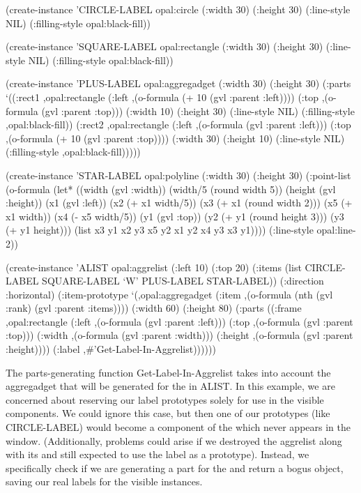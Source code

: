 \begin{programexample}
(create-instance 'CIRCLE-LABEL opal:circle
  (:width 30) (:height 30)
  (:line-style NIL)
  (:filling-style opal:black-fill))

(create-instance 'SQUARE-LABEL opal:rectangle
  (:width 30) (:height 30)
  (:line-style NIL)
  (:filling-style opal:black-fill))
\end{programexample}

\begin{programexample}
(create-instance 'PLUS-LABEL opal:aggregadget
  (:width 30) (:height 30)
  (:parts
   `((:rect1 ,opal:rectangle
      (:left ,(o-formula (+ 10 (gvl :parent :left))))
      (:top ,(o-formula (gvl :parent :top)))
      (:width 10) (:height 30)
      (:line-style NIL) (:filling-style ,opal:black-fill))
     (:rect2 ,opal:rectangle
      (:left ,(o-formula (gvl :parent :left)))
      (:top ,(o-formula (+ 10 (gvl :parent :top))))
      (:width 30) (:height 10)
      (:line-style NIL) (:filling-style ,opal:black-fill)))))
\end{programexample}

\begin{programexample}
(create-instance 'STAR-LABEL opal:polyline
  (:width 30) (:height 30)
  (:point-list (o-formula
		(let* ((width (gvl :width))    (width/5 (round width 5))
		       (height (gvl :height))  (x1 (gvl :left))
		       (x2 (+ x1 width/5))     (x3 (+ x1 (round width 2)))
		       (x5 (+ x1 width))       (x4 (- x5 width/5))
		       (y1 (gvl :top))         (y2 (+ y1 (round height 3)))
		       (y3 (+ y1 height)))
		  (list x3 y1  x2 y3  x5 y2  x1 y2  x4 y3  x3 y1))))
  (:line-style opal:line-2))
\end{programexample}

\begin{programexample}
(create-instance 'ALIST opal:aggrelist
  (:left 10) (:top 20)
  (:items (list CIRCLE-LABEL SQUARE-LABEL `W' PLUS-LABEL STAR-LABEL))
  (:direction :horizontal)
  (:item-prototype
   `(,opal:aggregadget
     (:item ,(o-formula (nth (gvl :rank) (gvl :parent :items))))
     (:width 60) (:height 80)
     (:parts
      ((:frame ,opal:rectangle
	       (:left ,(o-formula (gvl :parent :left)))
	       (:top ,(o-formula (gvl :parent :top)))
	       (:width ,(o-formula (gvl :parent :width)))
	       (:height ,(o-formula (gvl :parent :height))))
       (:label ,\#'Get-Label-In-Aggrelist))))))
\end{programexample}

The parts-generating function Get-Label-In-Aggrelist takes into
account the aggregadget that will be generated for the
 in ALIST.  In this example, we are
concerned about reserving our label prototypes solely for use in the
visible components.  We could ignore this case, but then one of our prototypes
(like CIRCLE-LABEL) would become a component of the 
which never appears in the window.  (Additionally, problems could
arise if we destroyed the aggrelist along with its 
and still expected to use the label as a prototype).  Instead, we
specifically check if we are generating a part for the
 and return a bogus object, saving our real
labels for the visible instances.

